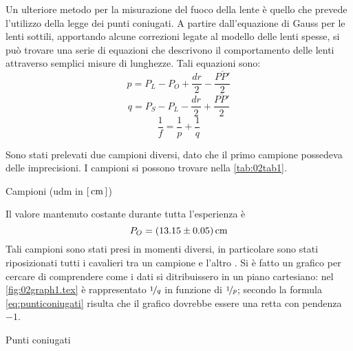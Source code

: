 Un ulteriore metodo per la misurazione del fuoco della lente è quello che prevede l'utilizzo della legge dei punti coniugati.
 A partire dall'equazione di Gauss per le lenti sottili, apportando alcune correzioni legate al modello delle lenti
 spesse, si può trovare una serie di equazioni che descrivono il comportamento delle lenti attraverso semplici misure di
 lunghezze. Tali equazioni sono:
\[p=P_L - P_O + \frac {dr} {2} - \frac {\overline{PP'}}{2}\]
\[q=P_S - P_L -\frac {dr} {2} + \frac {\overline{PP'}} {2}\]
\begin{equation} \label{eq:punticoniugati}
\frac{1}{f} = \frac {1}{p} + \frac {1}{q}
\end{equation}

 Sono stati prelevati due campioni diversi, dato che il primo campione possedeva delle imprecisioni. I campioni si possono trovare
 nella \autoref{tab:02tab1}.
\begin{tabella}
	\centering
	
	\caption{Campioni (udm in $[\,\mathrm{cm}\,]$)}
	\label{tab:02tab1}
\end{tabella}
%
Il valore mantenuto costante durante tutta l'esperienza \`e
\[P_O = (13.15 \pm 0.05) \,\mathrm{cm}\] 
Tali campioni sono stati presi in momenti diversi, in particolare sono stati riposizionati tutti i cavalieri tra un campione e l'altro
. Si \`e fatto un grafico per cercare di comprendere come i dati si ditribuissero in un piano cartesiano: nel  \autoref{fig:02graph1.tex} è rappresentato $\nicefrac{1}{q}$ in funzione di $\nicefrac{1}{p}$; secondo la formula
 \eqref{eq:punticoniugati} risulta che il grafico dovrebbe essere una retta con
 pendenza $-1$.
\begin{grafico} \centering  \caption{Punti coniugati} \label{fig:02graph1.tex} \end{grafico}

